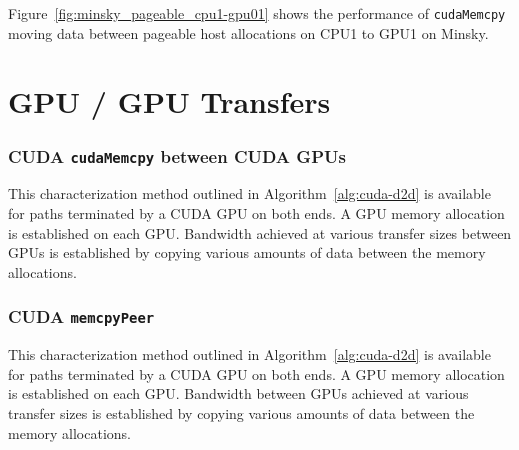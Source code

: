 Figure~\ref{fig:minsky_pageable_cpu1-gpu01} shows the performance of \texttt{cudaMemcpy} moving data between pageable host allocations on CPU1 to GPU1 on Minsky.

\section{GPU / GPU Transfers}


\subsubsection{CUDA \texttt{cudaMemcpy} between CUDA GPUs}

This characterization method outlined in Algorithm~\ref{alg:cuda-d2d} is available for paths terminated by a CUDA GPU on both ends.
A GPU memory allocation is established on each GPU.
Bandwidth achieved at various transfer sizes between GPUs is established by copying various amounts of data between the memory allocations.


\subsubsection{CUDA \texttt{memcpyPeer}}

This characterization method outlined in Algorithm~\ref{alg:cuda-d2d} is available for paths terminated by a CUDA GPU on both ends.
A GPU memory allocation is established on each GPU.
Bandwidth between GPUs achieved at various transfer sizes is established by copying various amounts of data between the memory allocations.



